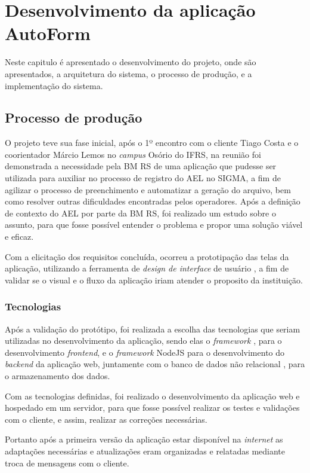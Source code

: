 \chapter{Desenvolvimento da aplicação AutoForm}
Neste capitulo é apresentado o desenvolvimento do projeto, onde são apresentados, a arquitetura do sistema, o processo de produção, e a implementação do sistema.

\section{Processo de produção}
O projeto teve sua fase inicial, após o 1º encontro com o cliente Tiago Costa e o coorientador Márcio Lemos no \textit{campus} Osório do IFRS, na reunião foi demonstrada a necessidade pela BM RS de uma aplicação que pudesse ser utilizada para auxiliar no processo de registro do AEL no SIGMA, a fim de agilizar o processo de preenchimento e automatizar a geração do arquivo, bem como resolver outras dificuldades encontradas pelos operadores.
Após a definição de contexto do AEL por parte da BM RS, foi realizado um estudo sobre o assunto, para que fosse possível entender o problema e propor uma solução viável e eficaz. 

Com a elicitação dos requisitos concluída, ocorreu a prototipação das telas da aplicação, utilizando a ferramenta de \textit{design de interface } de usuário , a fim de validar se o visual e o fluxo da aplicação iriam atender o proposito da instituição.

\subsection{Tecnologias}\label{sec:tecnologias}
Após a validação do protótipo, foi realizada a escolha das tecnologias que seriam utilizadas no desenvolvimento da aplicação, sendo elas o \textit{framework} , para o desenvolvimento \textit{frontend}, e o \textit{framework} NodeJS  para o desenvolvimento do \textit{backend} da aplicação web, juntamente com o banco de dados não relacional , para o armazenamento dos dados.

Com as tecnologias definidas, foi realizado o desenvolvimento da aplicação web e hospedado em um servidor, para que fosse possível realizar os testes e validações com o cliente, e assim, realizar as correções necessárias. 

Portanto após a primeira versão da aplicação estar disponível na \textit{internet} as adaptações necessárias e atualizações eram organizadas e relatadas mediante troca de mensagens com o cliente.

